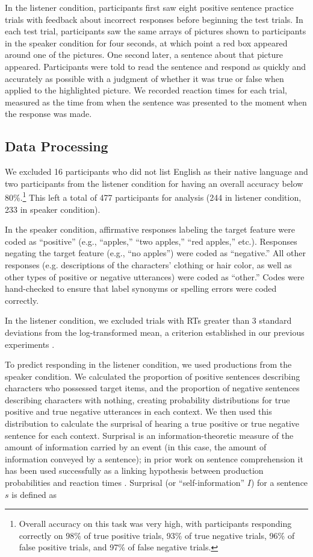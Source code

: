 \documentclass[man, noapacite]{apa2}
\begin{document}
In the listener condition, participants first saw eight positive sentence practice trials with feedback about incorrect responses before beginning the test trials. In each test trial, participants saw the same arrays of pictures shown to participants in the speaker condition for four seconds, at which point a red box appeared around one of the pictures.  One second later, a sentence about that picture appeared.  Participants were told to read the sentence and respond as quickly and accurately as possible with a judgment of whether it was true or false when applied to the highlighted picture.  We recorded reaction times for each trial, measured as the time from when the sentence was presented to the moment when the response was made.
  
\subsection{Data Processing} 
  
We excluded 16 participants who did not list English as their native language and two participants from the listener condition for having an overall accuracy below 80\%.\footnote{Overall accuracy on this task was very high, with participants responding correctly on 98\% of true positive trials, 93\% of true negative trials, 96\% of false positive trials, and 97\% of false negative trials.} This left a total of 477 participants for analysis (244 in listener condition, 233 in speaker condition). 

In the speaker condition, affirmative responses labeling the target feature were coded as ``positive'' (e.g., ``apples,'' ``two apples,'' ``red apples,'' etc.).  Responses negating the target feature (e.g., ``no apples'') were coded as ``negative.''  All other responses (e.g. descriptions of the characters' clothing or hair color, as well as other types of positive or negative utterances) were coded as ``other.''   Codes were hand-checked to ensure that label synonyms or spelling errors were coded correctly.

In the listener condition, we excluded trials with RTs greater than 3 standard deviations from the log-transformed mean, a criterion established in our previous experiments \cite{nordmeyer2014}.  

To predict responding in the listener condition, we used productions from the speaker condition. We calculated the proportion of positive sentences describing characters who possessed target items, and the proportion of negative sentences describing characters with nothing, creating probability distributions for true positive and true negative utterances in each context.  We then used this distribution to calculate the surprisal of hearing a true positive or true negative sentence for each context. Surprisal is an information-theoretic measure of the amount of information carried by an event (in this case, the amount of information conveyed by a sentence); in prior work on sentence comprehension it has been used successfully as a linking hypothesis between production probabilities and reaction times \cite{levy2008}. Surprisal (or ``self-information'' $I$) for a sentence $s$ is defined as
\end{document}

